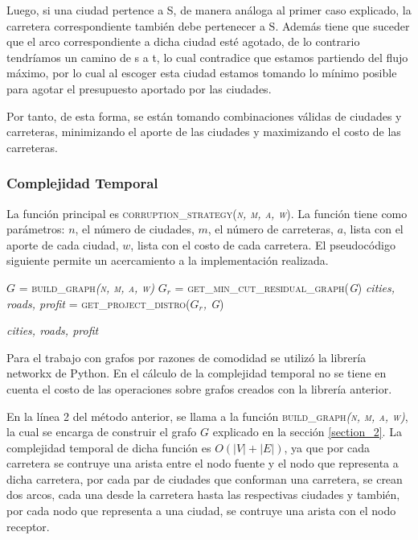 \documentclass[10pt]{article} %
\begin{document}
	Luego, si una ciudad pertence a S, de manera an\'aloga al primer caso explicado, la carretera correspondiente tambi\'en debe pertenecer a S. Adem\'as tiene que suceder que el arco correspondiente a dicha ciudad est\'e agotado, de lo contrario tendr\'iamos un camino de s a t, lo cual contradice que estamos partiendo del flujo m\'aximo, por lo cual al escoger esta ciudad estamos tomando lo m\'inimo posible para agotar el presupuesto aportado por las ciudades. 
	 
	Por tanto, de esta forma, se est\'an tomando combinaciones v\'alidas de ciudades y carreteras, minimizando el aporte de las ciudades y maximizando el costo de las carreteras.
	
	\subsubsection{Complejidad Temporal}
	
	La funci\'on principal es \textsc{corruption\_strategy(\textit{n, m, a, w})}. La funci\'on tiene como par\'ametros: $n$, el n\'umero de ciudades, $m$, el n\'umero de carreteras, $a$, lista con el aporte de cada ciudad, $w$, lista con el costo de cada carretera. El pseudoc\'odigo siguiente permite un acercamiento a la implementaci\'on realizada.
	
	\begin{algorithmic}[1]
		
		\State $G$ = \textsc{build\_graph\textit{(n, m, a, w)}}
		\State $G_r$ =\textsc{ get\_min\_cut\_residual\_graph(\textit{G})}
		\State \textit{cities, roads, profit} = \textsc{get\_project\_distro(\textit{$G_r$, G})}
		
		\Return \textit{cities, roads, profit}
		\EndFunction
	\end{algorithmic}

	Para el trabajo con grafos por razones de comodidad se utilizó la librería networkx de Python.	En el cálculo de la complejidad temporal no se tiene en cuenta el costo de las operaciones sobre
	grafos creados con la librería anterior.
	
	En la l\'inea 2 del m\'etodo anterior, se llama a la funci\'on \textsc{build\_graph\textit{(n, m, a, w)}}, la cual se encarga de construir el grafo $G$ explicado en la secci\'on \ref{section_2}. La complejidad temporal de dicha funci\'on es $O(|V| + |E|)$, ya que por cada carretera se contruye una arista entre el nodo fuente y el nodo que representa a dicha carretera,  por cada par de ciudades que conforman una carretera, se crean dos arcos, cada una desde la carretera hasta las respectivas ciudades y tambi\'en, por cada nodo que representa a una ciudad, se contruye una arista con el nodo receptor.
	
\end{document}
